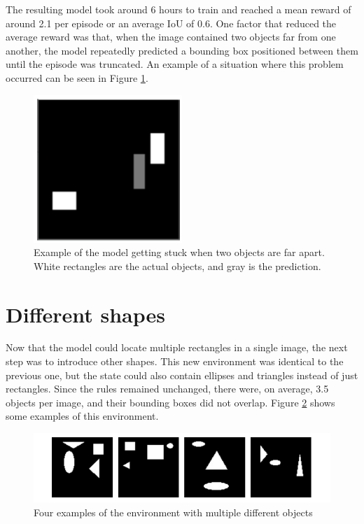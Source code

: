 \documentclass[
  digital,     %
  oneside,     %
  nosansbold,  %
  nocolorbold, %
  lof,         %
  lot,         %
]{fithesis4}
\begin{document}
The resulting model took around 6 hours to train and reached a mean reward of around 2.1 per episode or an average IoU of 0.6. One factor that reduced the average reward was that, when the image contained two objects far from one another, the model repeatedly predicted a bounding box positioned between them until the episode was truncated. An example of a situation where this problem occurred can be seen in Figure \ref{fig:v3_stuck}.

\begin{figure}
    \centering
    \includegraphics[width=0.5\linewidth]{results/v3_stuck.png}
    \caption{Example of the model getting stuck when two objects are far apart. White rectangles are the actual objects, and gray is the prediction.}
    \label{fig:v3_stuck}
\end{figure}

\section{Different shapes}
\label{sec:different_shapes}
Now that the model could locate multiple rectangles in a single image, the next step was to introduce other shapes. This new environment was identical to the previous one, but the state could also contain ellipses and triangles instead of just rectangles. Since the rules remained unchanged, there were, on average, 3.5 objects per image, and their bounding boxes did not overlap. Figure \ref{fig:env4} shows some examples of this environment.

\begin{figure}
    \includegraphics[width=1\linewidth]{env_examples/env4.pdf}
    \caption{Four examples of the environment with multiple different objects}
    \label{fig:env4}
\end{figure}
 
\end{document}
